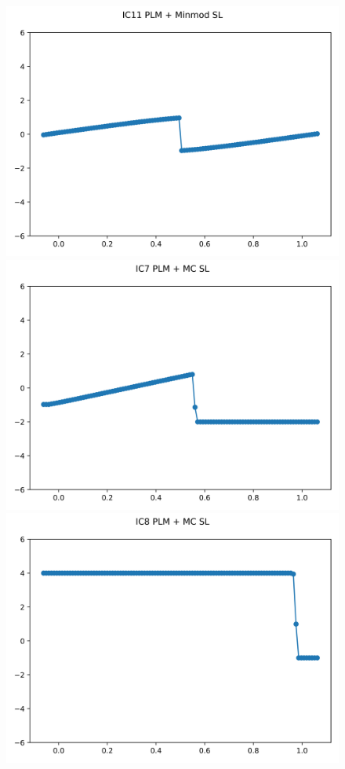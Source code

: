 \documentclass{article}
\begin{document}
\begin{figure}[t]
        \includegraphics[width=.95\textwidth]{../../code/hires_IC11Methodpm_plot.png}
    \emp
        \centering
        \includegraphics[width=.95\textwidth]{../../code/hires_IC7Methodpo_plot.png}
        \includegraphics[width=.95\textwidth]{../../code/hires_IC8Methodpo_plot.png}

\end{figure}
\end{document}
